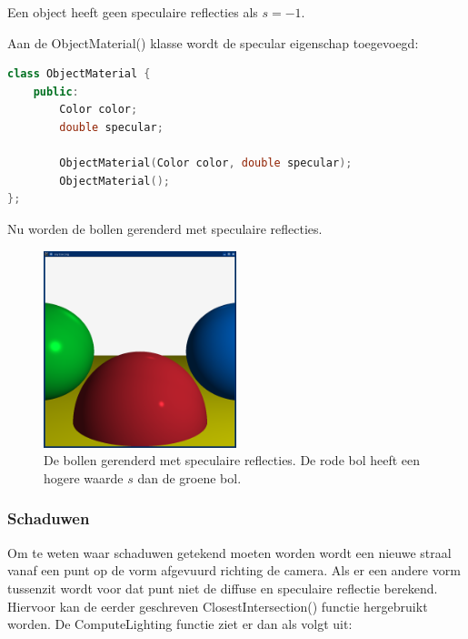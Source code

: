 \documentclass[12pt, a4paper]{article}
\begin{document}
Een object heeft geen speculaire reflecties als $s=-1$. 

Aan de ObjectMaterial() klasse wordt de specular eigenschap toegevoegd:

\begin{lstlisting}[language=C++]
class ObjectMaterial {
    public: 
        Color color;
        double specular;

        ObjectMaterial(Color color, double specular);
        ObjectMaterial();
};
\end{lstlisting}

Nu worden de bollen gerenderd met speculaire reflecties.

\begin{figure}[H]
    \centering
    \includegraphics[width=0.50\textwidth]{renders/specular.png}
    \caption{De bollen gerenderd met speculaire reflecties. De rode bol heeft een hogere waarde $s$ dan de groene bol.}
    \label{fig:specular}
\end{figure}

\subsubsection{Schaduwen}
Om te weten waar schaduwen getekend moeten worden wordt een nieuwe straal vanaf een punt op de vorm afgevuurd richting de camera. Als er een andere vorm tussenzit wordt voor dat punt niet de diffuse en speculaire reflectie berekend. Hiervoor kan de eerder geschreven ClosestIntersection() functie hergebruikt worden. De ComputeLighting functie ziet er dan als volgt uit:
\end{document}
